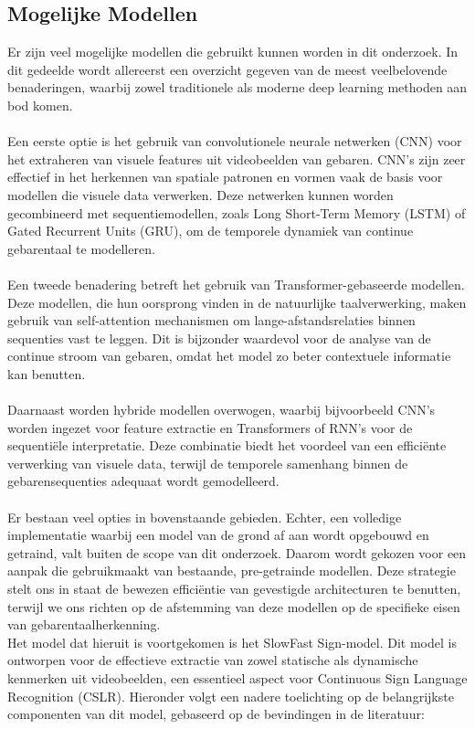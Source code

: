 \subsection{Mogelijke Modellen}
Er zijn veel mogelijke modellen die gebruikt kunnen worden in dit onderzoek. 
In dit gedeelde wordt allereerst een overzicht gegeven van de meest veelbelovende benaderingen, waarbij zowel traditionele als moderne deep learning methoden aan bod komen.
\\
\\
Een eerste optie is het gebruik van convolutionele neurale netwerken (CNN) voor het extraheren van visuele features uit videobeelden van gebaren. 
CNN's zijn zeer effectief in het herkennen van spatiale patronen en vormen vaak de basis voor modellen die visuele data verwerken. 
Deze netwerken kunnen worden gecombineerd met sequentiemodellen, zoals Long Short-Term Memory (LSTM) of Gated Recurrent Units (GRU), om de temporele dynamiek van continue gebarentaal te modelleren.
\\
\\
Een tweede benadering betreft het gebruik van Transformer-gebaseerde modellen. 
Deze modellen, die hun oorsprong vinden in de natuurlijke taalverwerking, maken gebruik van self-attention mechanismen om lange-afstandsrelaties binnen sequenties vast te leggen. 
Dit is bijzonder waardevol voor de analyse van de continue stroom van gebaren, omdat het model zo beter contextuele informatie kan benutten.
\\
\\
Daarnaast worden hybride modellen overwogen, waarbij bijvoorbeeld CNN's worden ingezet voor feature extractie en Transformers of RNN's voor de sequentiële interpretatie. 
Deze combinatie biedt het voordeel van een efficiënte verwerking van visuele data, terwijl de temporele samenhang binnen de gebarensequenties adequaat wordt gemodelleerd.
\\
\\
Er bestaan veel opties in bovenstaande gebieden. 
Echter, een volledige implementatie waarbij een model van de grond af aan wordt opgebouwd en getraind, valt buiten de scope van dit onderzoek. 
Daarom wordt gekozen voor een aanpak die gebruikmaakt van bestaande, pre-getrainde modellen. 
Deze strategie stelt ons in staat de bewezen efficiëntie van gevestigde architecturen te benutten, terwijl we ons richten op de afstemming van deze modellen op de specifieke eisen van gebarentaalherkenning.
\\
Het model dat hieruit is voortgekomen is het SlowFast Sign-model. 
Dit model is ontworpen voor de effectieve extractie van zowel statische als dynamische kenmerken uit videobeelden, een essentieel aspect voor Continuous Sign Language Recognition (CSLR). 
Hieronder volgt een nadere toelichting op de belangrijkste componenten van dit model, gebaseerd op de bevindingen in de literatuur:


